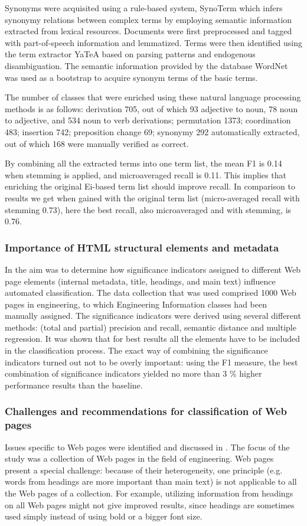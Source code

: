 Synonyms were acquisited using a rule-based system, SynoTerm which infers synonymy relations between complex terms by employing semantic information extracted from lexical resources. Documents were first preprocessed and tagged with part-of-speech information and lemmatized. Terms were then identified using the term extractor YaTeA based on parsing patterns and endogenous disambiguation.  The semantic information provided by the database WordNet was used as a bootstrap to acquire synonym terms of the basic terms. 

The number of classes that were enriched using these natural language processing methods is as follows: derivation 705, out of which 93 adjective to noun, 78 noun to adjective, and 534 noun to verb derivations; permutation 1373; coordination 483; insertion 742; preposition change 69; synonymy 292 automatically extracted, out of which 168 were manually verified as correct. 

By combining all the extracted terms into one term list, the mean F1 is 0.14 when stemming is applied, and microaveraged recall is 0.11. This implies that enriching the original Ei-based term list should improve recall. In comparison to results we get when gained with the original term list (micro-averaged recall with stemming 0.73), here the best recall, also microaveraged and with stemming, is 0.76.

\subsubsection{Importance of HTML structural elements and metadata}
In \cite{ardo05:_ECDL} the aim was to determine how significance indicators assigned to different Web page elements (internal metadata, title, headings, and main text) influence automated classification. The data collection that was used comprised 1000 Web pages in engineering, to which Engineering Information classes had been manually assigned. The significance indicators were derived using several different methods: (total and partial) precision and recall, semantic distance and multiple regression. It was shown that for best results all the elements have to be included in the classification process. The exact way of combining the significance indicators turned out not to be overly important: using the F1 measure, the best combination of significance indicators yielded no more than 3 \% higher performance results than the baseline.

\subsubsection{Challenges and recommendations for classification of Web pages}
Issues specific to Web pages were identified and discussed in \cite{GolubChall}. The focus of the study was a collection of Web pages in the field of engineering. Web pages present a special challenge: because of their heterogeneity, one principle (e.g. words from headings are more important than main text) is not applicable to all the Web pages of a collection. For example, utilizing information from headings on all Web pages might not give improved results, since headings are sometimes used simply instead of using bold or a bigger font size.

